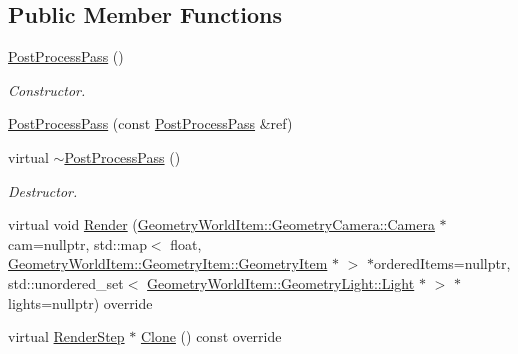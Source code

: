\subsection*{Public Member Functions}
\begin{DoxyCompactItemize}
\item 
\mbox{\label{class_geometry_engine_1_1_geometry_render_step_1_1_post_process_pass_a258391904e3ae85a77f4bd471f15c60c}} 
\mbox{\hyperlink{class_geometry_engine_1_1_geometry_render_step_1_1_post_process_pass_a258391904e3ae85a77f4bd471f15c60c}{Post\+Process\+Pass}} ()
\begin{DoxyCompactList}\small\item\em Constructor. \end{DoxyCompactList}\item 
\mbox{\hyperlink{class_geometry_engine_1_1_geometry_render_step_1_1_post_process_pass_a79e267f8b485ebd55a9ac01ed0717f02}{Post\+Process\+Pass}} (const \mbox{\hyperlink{class_geometry_engine_1_1_geometry_render_step_1_1_post_process_pass}{Post\+Process\+Pass}} \&ref)
\item 
\mbox{\label{class_geometry_engine_1_1_geometry_render_step_1_1_post_process_pass_a638c1407f0a547b7b8c3b44914a7d6f7}} 
virtual \mbox{\hyperlink{class_geometry_engine_1_1_geometry_render_step_1_1_post_process_pass_a638c1407f0a547b7b8c3b44914a7d6f7}{$\sim$\+Post\+Process\+Pass}} ()
\begin{DoxyCompactList}\small\item\em Destructor. \end{DoxyCompactList}\item 
virtual void \mbox{\hyperlink{class_geometry_engine_1_1_geometry_render_step_1_1_post_process_pass_a4d41ac05dcf1533296a7fbda443f38fb}{Render}} (\mbox{\hyperlink{class_geometry_engine_1_1_geometry_world_item_1_1_geometry_camera_1_1_camera}{Geometry\+World\+Item\+::\+Geometry\+Camera\+::\+Camera}} $\ast$cam=nullptr, std\+::map$<$ float, \mbox{\hyperlink{class_geometry_engine_1_1_geometry_world_item_1_1_geometry_item_1_1_geometry_item}{Geometry\+World\+Item\+::\+Geometry\+Item\+::\+Geometry\+Item}} $\ast$ $>$ $\ast$ordered\+Items=nullptr, std\+::unordered\+\_\+set$<$ \mbox{\hyperlink{class_geometry_engine_1_1_geometry_world_item_1_1_geometry_light_1_1_light}{Geometry\+World\+Item\+::\+Geometry\+Light\+::\+Light}} $\ast$ $>$ $\ast$lights=nullptr) override
\item 
virtual \mbox{\hyperlink{class_geometry_engine_1_1_geometry_render_step_1_1_render_step}{Render\+Step}} $\ast$ \mbox{\hyperlink{class_geometry_engine_1_1_geometry_render_step_1_1_post_process_pass_afcf20dc0a20cf1e0fb730c7b56071c26}{Clone}} () const override
\end{DoxyCompactItemize}
